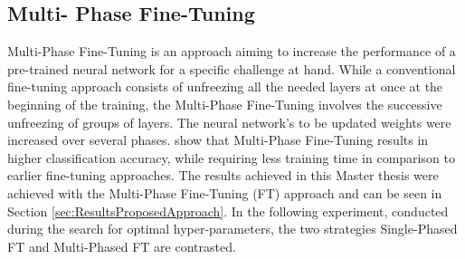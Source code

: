 \subsection{Multi- Phase Fine-Tuning}
Multi-Phase Fine-Tuning is an approach aiming to increase the performance of a pre-trained neural network for a specific challenge at hand. While a conventional fine-tuning approach consists of unfreezing all the needed layers at once at the beginning of the training, the Multi-Phase Fine-Tuning involves the successive unfreezing of groups of layers. The neural network's to be updated weights were increased over several phases. \citet{Sarhan:2020:MultiPhaseFineTuning} show that Multi-Phase Fine-Tuning results in higher classification accuracy, while requiring less training time in comparison to earlier fine-tuning approaches.
\newline\newline
The results achieved in this Master thesis were achieved with the Multi-Phase Fine-Tuning (FT) approach and can be seen in Section \ref{sec:ResultsProposedApproach}. In the following experiment, conducted during the search for optimal hyper-parameters, the two strategies Single-Phased FT and Multi-Phased FT are contrasted. \newline

